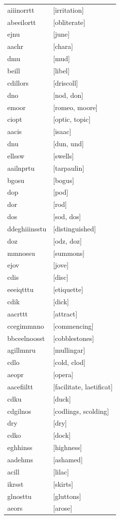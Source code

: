 \documentclass{article}
\begin{document}
\begin{tabular}{ll}
aiiinorrtt & [irritation] \\
abeeilortt & [obliterate] \\
ejnu & [june] \\
aachr & [chara] \\
dmu & [mud] \\
beill & [libel] \\
cdillors & [driscoll] \\
dno & [nod, don] \\
emoor & [romeo, moore] \\
ciopt & [optic, topic] \\
aacis & [isaac] \\
dnu & [dun, und] \\
ellssw & [swells] \\
aailnprtu & [tarpaulin] \\
bgosu & [bogus] \\
dop & [pod] \\
dor & [rod] \\
dos & [sod, dos] \\
ddeghiiinsstu & [distinguished] \\
doz & [odz, doz] \\
mmnossu & [summons] \\
ejov & [jove] \\
cdis & [disc] \\
eeeiqtttu & [etiquette] \\
cdik & [dick] \\
aacrttt & [attract] \\
ccegimmnno & [commencing] \\
bbceelnoosst & [cobblestones] \\
agillmnru & [mullingar] \\
cdlo & [cold, clod] \\
aeopr & [opera] \\
aacefiiltt & [facilitate, laetificat] \\
cdku & [duck] \\
cdgilnos & [codlings, scolding] \\
dry & [dry] \\
cdko & [dock] \\
eghhinss & [highness] \\
aadehms & [ashamed] \\
acill & [lilac] \\
ikrsst & [skirts] \\
glnosttu & [gluttons] \\
aeors & [arose] \\

\end{tabular}
\end{document}
